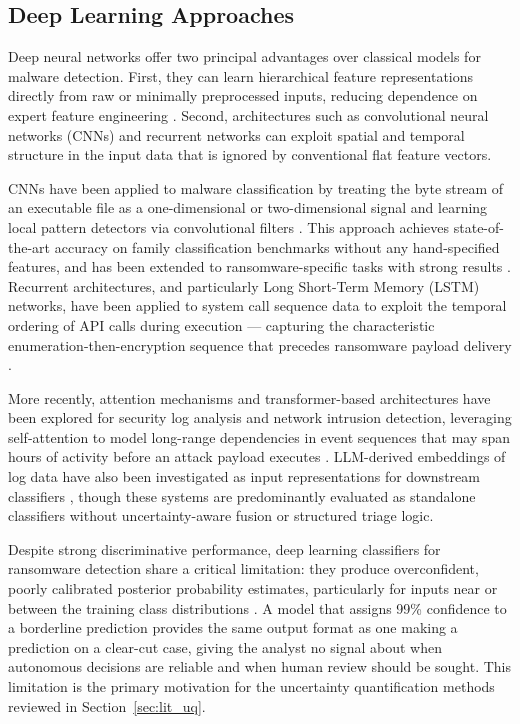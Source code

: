 \subsection{Deep Learning Approaches}
\label{sec:lit_deep}

Deep neural networks offer two principal advantages over classical models for malware
detection.
First, they can learn hierarchical feature representations directly from raw or minimally
preprocessed inputs, reducing dependence on expert feature engineering \cite{gibert2020rise}.
Second, architectures such as convolutional neural networks (CNNs) and recurrent networks
can exploit spatial and temporal structure in the input data that is ignored by conventional
flat feature vectors.

CNNs have been applied to malware classification by treating the byte stream of an executable
file as a one-dimensional or two-dimensional signal and learning local pattern detectors via
convolutional filters \cite{kolosnjaji2016deep}.
This approach achieves state-of-the-art accuracy on family classification benchmarks without
any hand-specified features, and has been extended to ransomware-specific tasks with strong
results \cite{zahoora2022Deep}.
Recurrent architectures, and particularly Long Short-Term Memory (LSTM) networks, have been
applied to system call sequence data to exploit the temporal ordering of API calls during
execution — capturing the characteristic enumeration-then-encryption sequence that precedes
ransomware payload delivery \cite{hirano2022ransap, HiranoK22}.

More recently, attention mechanisms and transformer-based architectures \cite{vaswani2017attention}
have been explored for security log analysis and network intrusion detection, leveraging
self-attention to model long-range dependencies in event sequences that may span hours of
activity before an attack payload executes \cite{tian2025llmsurvey, ZhangLZYHY25}.
LLM-derived embeddings of log data have also been investigated as input representations for
downstream classifiers \cite{tian2025llmsurvey}, though these systems are predominantly
evaluated as standalone classifiers without uncertainty-aware fusion or structured triage
logic.

Despite strong discriminative performance, deep learning classifiers for ransomware detection
share a critical limitation: they produce overconfident, poorly calibrated posterior
probability estimates, particularly for inputs near or between the training class
distributions \cite{gawlikowski2023Uncertainity, guo2017calibration}.
A model that assigns 99\% confidence to a borderline prediction provides the same output
format as one making a prediction on a clear-cut case, giving the analyst no signal about
when autonomous decisions are reliable and when human review should be sought.
This limitation is the primary motivation for the uncertainty quantification methods reviewed
in Section~\ref{sec:lit_uq}.


